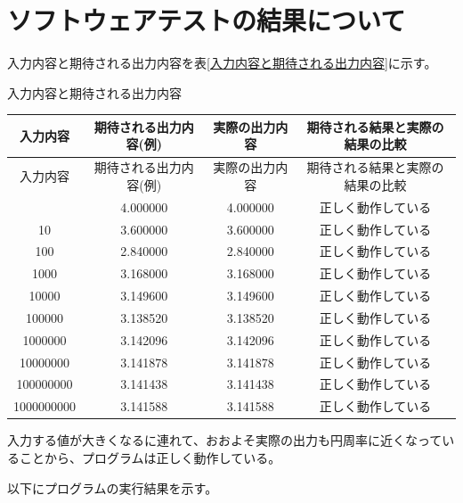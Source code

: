 

\section{ソフトウェアテストの結果について}
入力内容と期待される出力内容を表\ref{入力内容と期待される出力内容}に示す。
\begin{table}[H]
    \centering
    \caption{入力内容と期待される出力内容}
    \label{入力内容と期待される出力内容}
\end{table}
\begin{longtable}{|c|c|c|c|} %
    \hline
    入力内容 & 期待される出力内容(例) & 実際の出力内容 & 期待される結果と実際の結果の比較 \\ \hline
    \endfirsthead
    \hline
    入力内容 & 期待される出力内容(例) & 実際の出力内容 & 期待される結果と実際の結果の比較 \\ \hline
    \endhead
    \endfoot
    1 & 4.000000 & 4.000000 & 正しく動作している \\
    10 & 3.600000 & 3.600000 & 正しく動作している \\
    100 & 2.840000 & 2.840000 & 正しく動作している \\
    1000 & 3.168000 & 3.168000 & 正しく動作している \\
    10000 & 3.149600 & 3.149600 & 正しく動作している \\
    100000 & 3.138520 & 3.138520 & 正しく動作している \\
    1000000 & 3.142096 & 3.142096 & 正しく動作している \\
    10000000 & 3.141878 & 3.141878 & 正しく動作している \\
    100000000 & 3.141438 & 3.141438 & 正しく動作している \\
    1000000000 & 3.141588 & 3.141588 & 正しく動作している \\
    \hline
\end{longtable}
入力する値が大きくなるに連れて、おおよそ実際の出力も円周率に近くなっていることから、プログラムは正しく動作している。

以下にプログラムの実行結果を示す。

